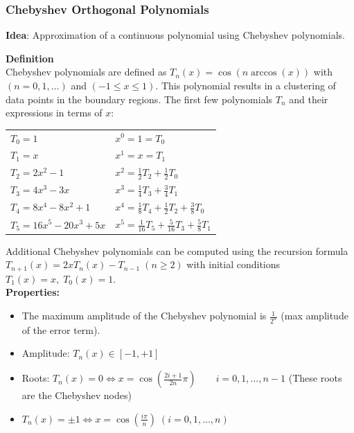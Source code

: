 \newpage
\subsubsection{Chebyshev Orthogonal Polynomials} \label{sssec:chebyshev_polynom}
\textbf{Idea}: Approximation of a continuous polynomial using Chebyshev polynomials.

\textbf{Definition}\\
Chebyshev polynomials are defined as $\boxed{T_n(x) = \cos(n \arccos(x))}$ with $(n = 0,1,\ldots)$ and $(-1 \leq x \leq 1)$. This
polynomial results in a clustering of data points in the boundary regions. The
first few polynomials $T_n$ and their expressions in terms of $x$:
\begin{tabular}{ll}
  $T_0 = 1$ & $x^0 = 1 = T_0$ \\
  $T_1 = x$ & $x^1 = x = T_1$ \\
  $T_2 = 2x^2 -1$ & $x^2 = \frac12 T_2 + \frac12 T_0$ \\
  $T_3 = 4x^3 - 3x$ & $x^3 = \frac14 T_3 + \frac34 T_1$\\
  $T_4 = 8x^4 -8x^2 + 1$ & $x^4 = \frac18 T_4 + \frac12 T_2 + \frac38 T_0$\\
  $T_5 = 16x^5 - 20x^3 + 5x$ & $x^5 = \frac{1}{16} T_5 + \frac{5}{16} T_3 + \frac58 T_1$\\
\end{tabular}

Additional Chebyshev polynomials can be computed using the recursion formula
$T_{n+1}(x) = 2x T_n(x) - T_{n-1}\; (n\geq2)$
with initial conditions $T_1(x)=x,\;T_0(x)=1$.\\

\textbf{Properties:}
\begin{itemize}
  \item The maximum amplitude of the Chebyshev polynomial is $\frac{1}{2^n}$ (max amplitude of the error term).
  \item Amplitude: $T_n(x) \in [-1,+1]$
  \item Roots: $T_n(x)=0 \Leftrightarrow x=\cos(\frac{2i+1}{2n}\pi)\qquad i=0,1,\ldots,n-1$ (These roots are the Chebyshev nodes)
  \item $T_n(x)= \pm 1 \Leftrightarrow x=\cos(\frac{i\pi}{n}) \; (i=0,1,\ldots,n)$
\end{itemize}

